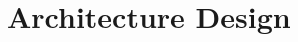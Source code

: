 \documentclass[conference,compsoc]{IEEEtran}
\begin{document}








\section{Architecture Design}\label{sec:architecture}
\end{document}

